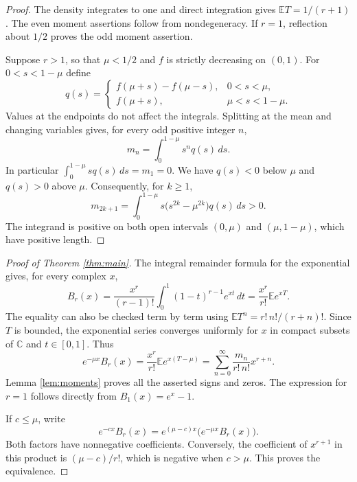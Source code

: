 \documentclass[11pt]{article}
\newcommand{\E}{\mathbb E}
\begin{document}
\begin{proof}
The density integrates to one and direct integration gives
$\E T=1/(r+1)$. The even moment assertions follow from nondegeneracy.
If $r=1$, reflection about $1/2$ proves the odd moment assertion.

Suppose $r>1$, so that $\mu<1/2$ and $f$ is strictly decreasing on
$(0,1)$. For $0<s<1-\mu$ define
\[
 q(s)=
 \begin{cases}
 f(\mu+s)-f(\mu-s),&0<s<\mu,\\
 f(\mu+s),&\mu<s<1-\mu .
 \end{cases}
\]
Values at the endpoints do not affect the integrals. Splitting at the
mean and changing variables gives, for every odd positive integer $n$,
\[
 m_n=\int_0^{1-\mu}s^nq(s)\,ds.
\]
In particular $\int_0^{1-\mu}s q(s)\,ds=m_1=0$.
We have $q(s)<0$ below $\mu$ and $q(s)>0$ above $\mu$.
Consequently, for $k\geq1$,
\[
 m_{2k+1}
 =\int_0^{1-\mu}s\bigl(s^{2k}-\mu^{2k}\bigr)q(s)\,ds>0.
\]
The integrand is positive on both open intervals $(0,\mu)$ and
$(\mu,1-\mu)$, which have positive length.
\end{proof}

\begin{proof}[Proof of Theorem \ref{thm:main}]
The integral remainder formula for the exponential gives, for every
complex $x$,
\[
 B_r(x)=\frac{x^r}{(r-1)!}
        \int_0^1(1-t)^{r-1}e^{xt}\,dt
       =\frac{x^r}{r!}\E e^{xT}.
\]
The equality can also be checked term by term using
$\E T^n=r!\,n!/(r+n)!$.
Since $T$ is bounded, the exponential series converges uniformly for
$x$ in compact subsets of $\mathbb C$ and $t\in[0,1]$. Thus
\begin{equation}\label{eq:coefficients}
 e^{-\mu x}B_r(x)=
 \frac{x^r}{r!}\E e^{x(T-\mu)}
 =\sum_{n=0}^{\infty}\frac{m_n}{r!\,n!}x^{r+n}.
\end{equation}
Lemma \ref{lem:moments} proves all the asserted signs and zeros.
The expression for $r=1$ follows directly from $B_1(x)=e^x-1$.

If $c\leq\mu$, write
\[
 e^{-cx}B_r(x)=e^{(\mu-c)x}
              \bigl(e^{-\mu x}B_r(x)\bigr).
\]
Both factors have nonnegative coefficients. Conversely, the coefficient
of $x^{r+1}$ in this product is $(\mu-c)/r!$, which is negative when
$c>\mu$. This proves the equivalence.
\end{proof}
\end{document}
